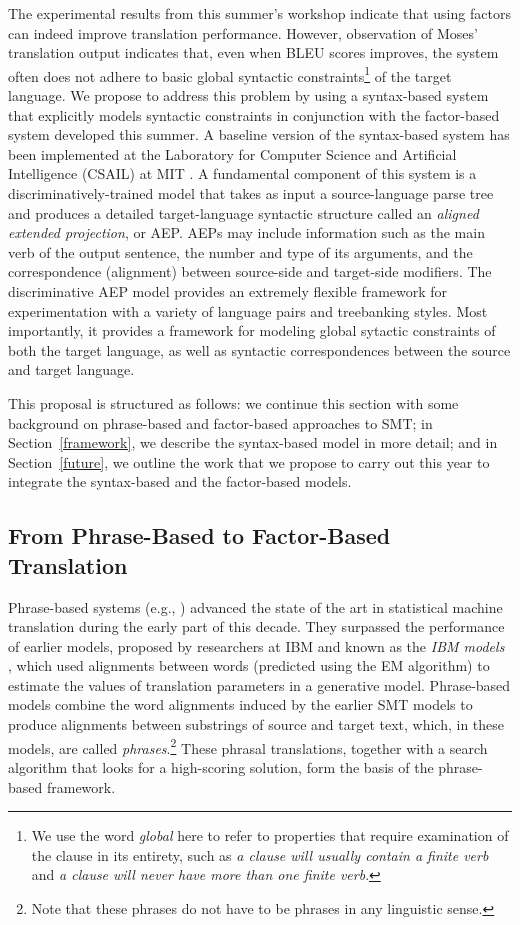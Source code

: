 \documentclass[11pt]{report}
\theoremstyle{plain}
\begin{document}
{The experimental results from this summer's workshop indicate that
using factors can indeed improve translation performance. However,
observation of Moses' translation output indicates that, even when
BLEU scores improves, the system often does not adhere to basic global
syntactic constraints\footnote{We use the word {\em global} here to
refer to properties that require examination of the clause in its
entirety, such as {\em a clause will usually contain a finite verb}
and {\em a clause will never have more than one finite verb}.} of the
target language. We propose to address this problem by using a
syntax-based system that explicitly models syntactic constraints in
conjunction with the factor-based system developed this summer. A
baseline version of the syntax-based system has been implemented at
the Laboratory for Computer Science and Artificial Intelligence
(CSAIL) at MIT . A fundamental component of this system
is a discriminatively-trained model that takes as input a
source-language parse tree and produces a detailed target-language
syntactic structure called an {\em aligned extended projection}, or
AEP. AEPs may include information such as the main verb of the output
sentence, the number and type of its arguments, and the correspondence
(alignment) between source-side and target-side modifiers. The
discriminative AEP model provides an extremely flexible framework for
experimentation with a variety of language pairs and treebanking
styles. Most importantly, it provides a framework for modeling global
sytactic constraints of both the target language, as well as syntactic
correspondences between the source and target language.

This proposal is structured as follows: we continue this section with
some background on phrase-based and factor-based approaches to SMT; in
Section~\ref{framework}, we describe the syntax-based model in more
detail; and in Section~\ref{future}, we outline the work that we
propose to carry out this year to integrate the syntax-based and the
factor-based models.

\subsection{From Phrase-Based to Factor-Based Translation}
Phrase-based systems (e.g., )
advanced the state of the art in statistical machine translation
during the early part of this decade. They surpassed the performance
of earlier models, proposed by researchers at IBM and known as the
{\em IBM models} , which used alignments between words
(predicted using the EM algorithm) to estimate the values of
translation parameters in a generative model.  Phrase-based models
combine the word alignments induced by the earlier SMT models to
produce alignments between substrings of source and target text,
which, in these models, are called {\em phrases}.\footnote{Note that
these phrases do not have to be phrases in any linguistic sense.}
These phrasal translations, together with a search algorithm that
looks for a high-scoring solution, form the basis of the phrase-based
framework.

}
\end{document}
